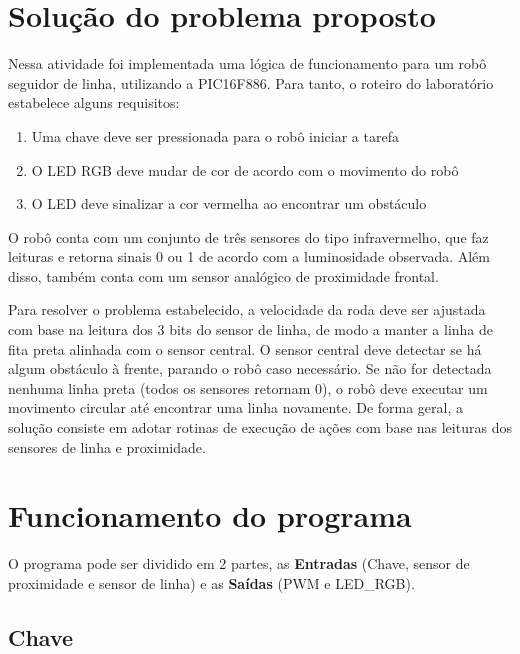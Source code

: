\documentclass{article}
\begin{document}
\section{Solução do problema proposto}
Nessa atividade foi implementada uma lógica de funcionamento para um robô seguidor de linha, utilizando a PIC16F886. Para tanto, o roteiro do laboratório estabelece alguns requisitos:
\begin{enumerate}
  \item Uma chave deve ser pressionada para o robô iniciar a tarefa
  \item O LED RGB deve mudar de cor de acordo com o movimento do robô
  \item O LED deve sinalizar a cor vermelha ao encontrar um obstáculo
\end{enumerate}
O robô conta com um conjunto de três sensores do tipo infravermelho, que faz leituras e retorna sinais 0 ou 1 de acordo com a luminosidade observada. Além disso, também conta com um sensor analógico de proximidade frontal.

Para resolver o problema estabelecido, a velocidade da roda deve ser ajustada com base na leitura dos 3 bits do sensor de linha, de modo a manter a linha de fita preta alinhada com o sensor central. O sensor central deve detectar se há algum obstáculo à frente, parando o robô caso necessário. Se não for detectada nenhuma linha preta (todos os sensores retornam 0), o robô deve executar um movimento circular até encontrar uma linha novamente.
De forma geral, a solução consiste em adotar rotinas de execução de ações com base nas leituras dos sensores de linha e proximidade.
\section{Funcionamento do programa}


O programa pode ser dividido em 2 partes, as \textbf{Entradas} (Chave, sensor de proximidade e sensor de linha) e as \textbf{Saídas} (PWM e LED\_RGB).

\subsection{Chave}
\end{document}

